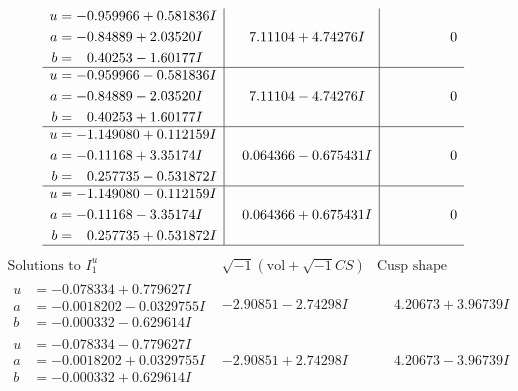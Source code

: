 \documentclass[1p]{elsarticle_modified}
\theoremstyle{definition}
\newcommand{\I}{\sqrt{-1}}
\begin{document}
$$\begin{array}{c|c|c}
\begin{aligned}
u &= -0.959966 + 0.581836 I \\
a &= -0.84889 + 2.03520 I \\
b &= \phantom{-}0.40253 - 1.60177 I\end{aligned}
 & \phantom{-}7.11104 + 4.74276 I & \phantom{-0.000000 } 0 \\ \hline\begin{aligned}
u &= -0.959966 - 0.581836 I \\
a &= -0.84889 - 2.03520 I \\
b &= \phantom{-}0.40253 + 1.60177 I\end{aligned}
 & \phantom{-}7.11104 - 4.74276 I & \phantom{-0.000000 } 0 \\ \hline\begin{aligned}
u &= -1.149080 + 0.112159 I \\
a &= -0.11168 + 3.35174 I \\
b &= \phantom{-}0.257735 - 0.531872 I\end{aligned}
 & \phantom{-}0.064366 - 0.675431 I & \phantom{-0.000000 } 0 \\ \hline\begin{aligned}
u &= -1.149080 - 0.112159 I \\
a &= -0.11168 - 3.35174 I \\
b &= \phantom{-}0.257735 + 0.531872 I\end{aligned}
 & \phantom{-}0.064366 + 0.675431 I & \phantom{-0.000000 } 0\\
 \hline 
 \end{array}$$\newpage$$\begin{array}{c|c|c}  
\text{Solutions to }I^u_{1}& \I (\text{vol} + \sqrt{-1}CS) & \text{Cusp shape}\\
 \hline 
\begin{aligned}
u &= -0.078334 + 0.779627 I \\
a &= -0.0018202 - 0.0329755 I \\
b &= -0.000332 - 0.629614 I\end{aligned}
 & -2.90851 - 2.74298 I & \phantom{-}4.20673 + 3.96739 I \\ \hline\begin{aligned}
u &= -0.078334 - 0.779627 I \\
a &= -0.0018202 + 0.0329755 I \\
b &= -0.000332 + 0.629614 I\end{aligned}
 & -2.90851 + 2.74298 I & \phantom{-}4.20673 - 3.96739 I \\ \hline\begin{aligned}

\end{aligned}
\end{array}$$
\end{document}
